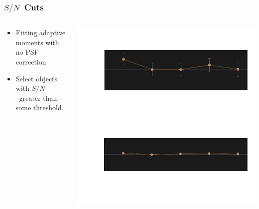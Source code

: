 \documentclass{beamer}
\newcommand{\snr}{$S/N$}
\begin{document}
\frame
{
    \frametitle{\snr\ Cuts}
 
 
    \begin{columns}
        \begin{column}{0.4\textwidth}
            \begin{itemize}
                \item Fitting {\color{lightsteelblue} adaptive moments} with 
                    {\color{red} no PSF correction}
                \item Select objects with \snr\ greater than some threshold.
            \end{itemize}
        \end{column}
        \begin{column}{0.6\textwidth}
            \begin{center}
            \includegraphics[width=\textwidth]{mc-select-bias-thresh-inv.pdf}
                \newline
            \end{center}
        \end{column}
    \end{columns}


}
\end{document}
